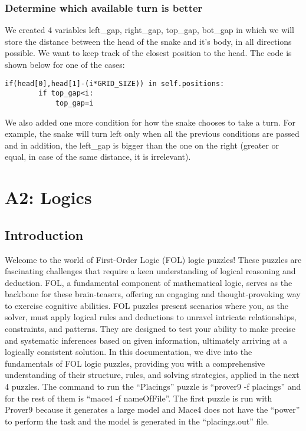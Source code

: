 \documentclass[a4paper,12pt]{report}
\begin{document}
\subsection{Determine which available turn is better}
We created 4 variables left\_gap, right\_gap, top\_gap, bot\_gap in which 
we will store the distance between the head of the snake and it's body, 
in all directions possible. We want to keep track of the closest position
to the head. The code is shown below for one of the cases: 
\begin{verbatim}
if(head[0],head[1]-(i*GRID_SIZE)) in self.positions:
		if top_gap<i:
			top_gap=i
\end{verbatim}
We also added one more condition for how the snake chooses to take a turn. 
For example, the snake will turn left only when all the previous conditions
are passed and in addition, the left\_gap is bigger than the one on the right
(greater or equal, in case of the same distance, it is irrelevant).
\chapter{A2: Logics}

\section{Introduction}
Welcome to the world of First-Order Logic (FOL) logic puzzles! These puzzles are fascinating challenges that require a keen understanding of logical reasoning and deduction. FOL, a fundamental component of mathematical logic, serves as the backbone for these brain-teasers, offering an engaging and thought-provoking way to exercise cognitive abilities.\newline \newline
FOL puzzles present scenarios where you, as the solver, must apply logical rules and deductions to unravel intricate relationships, constraints, and patterns. They are designed to test your ability to make precise and systematic inferences based on given information, ultimately arriving at a logically consistent solution. \newline \newline
In this documentation, we dive into the fundamentals of FOL logic puzzles, providing you with a comprehensive understanding of their structure, rules, and solving strategies, applied in the next 4 puzzles.\newline \newline
The command to run the ``Placings'' puzzle is ``prover9 -f placings'' and for the rest of them is ``mace4 -f nameOfFile''. The first puzzle is run with Prover9 because it generates a large model and Mace4 does not have the ``power'' to perform the task and the model is generated in the ``placings.out'' file.
\end{document}
